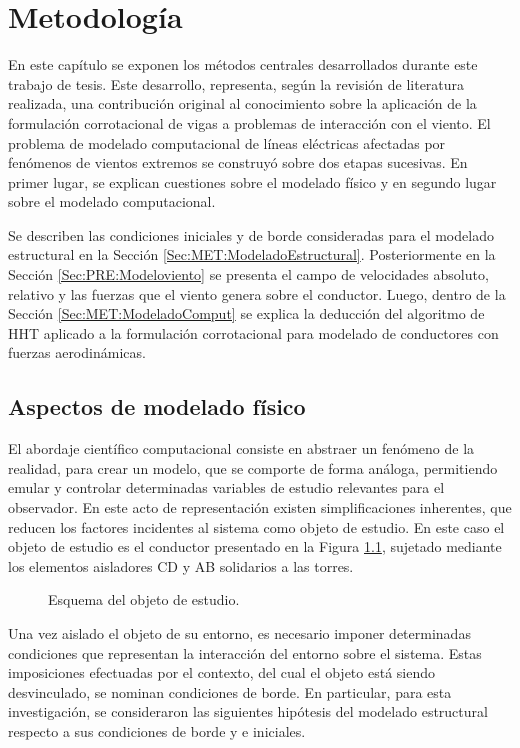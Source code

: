 \chapter{Metodología}\label{Cap:Metodologia}
\linenumbers

En este capítulo se exponen los métodos centrales desarrollados durante este trabajo de tesis. Este desarrollo, representa, según la revisión de literatura realizada, una contribución original al conocimiento sobre la aplicación de la formulación corrotacional de vigas a problemas de interacción con el viento. El problema de modelado computacional de líneas eléctricas afectadas por fenómenos de vientos extremos se construyó sobre dos etapas sucesivas. En primer lugar, se explican cuestiones sobre el modelado físico y en segundo lugar sobre el modelado computacional.

Se describen las condiciones iniciales y de borde consideradas para el modelado estructural en la Sección \ref{Sec:MET:ModeladoEstructural}. Posteriormente en la Sección \ref{Sec:PRE:Modeloviento} se presenta el campo de velocidades absoluto, relativo y las fuerzas que el viento genera sobre el conductor. Luego, dentro de la Sección \ref{Sec:MET:ModeladoComput} se explica la deducción del algoritmo de HHT aplicado a la formulación corrotacional para modelado de conductores con fuerzas aerodinámicas.

\section{Aspectos de modelado físico}

El abordaje científico computacional consiste en abstraer un fenómeno de la realidad, para crear un modelo, que se comporte de forma análoga, permitiendo emular y controlar determinadas variables de estudio relevantes para el observador. En este acto de representación existen simplificaciones inherentes, que reducen los factores incidentes al sistema como objeto de estudio. En este caso el objeto de estudio es el conductor presentado en la Figura \ref{fig:MET:EsquemaCondiciones}, sujetado mediante los elementos aisladores CD y AB solidarios a las torres.

\begin{figure}[htbp]
	\centering
	\def\svgwidth{80mm}
	
	\caption{Esquema del objeto de estudio.}
	\label{fig:MET:EsquemaCondiciones}
\end{figure}

Una vez aislado el objeto de su entorno, es necesario imponer determinadas condiciones que representan la interacción del entorno sobre el sistema. Estas imposiciones efectuadas por el contexto, del cual el objeto está siendo desvinculado, se nominan condiciones de borde. En particular, para esta investigación, se consideraron las siguientes hipótesis del modelado estructural respecto a sus condiciones de borde y e iniciales.


